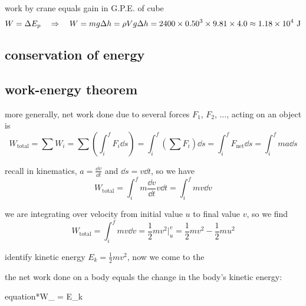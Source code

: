 \begin{soln}
    
work by crane equals gain in G.P.E. of cube
\begin{equation*}
W = \Delta E_p \quad \Rightarrow \quad W = mg\Delta h = \rho V g \Delta h = 2400 \times 0.50^3 \times 9.81 \times 4.0 \approx 1.18\times10^4 \text{ J} 
\end{equation*}
\end{soln}

\subsection{conservation of energy}\label{ch:conservation-of-energy}

\subsection{work-energy theorem \piste}

more generally, net work done due to several forces $F_1$, $F_2$, $\dots$, acting on an object is
\begin{equation*}
W_\text{total} = \sum W_i = \sum \left(\int_i^f F_i \dd s\right) = \int_i^f \left(\sum F_i \right)\dd s = \int_i^f F_\text{net} \dd s = \int_i^f ma \dd s
\end{equation*}

recall in kinematics, $a=\frac{\dd v}{\dd t}$ and $\dd s = v \dd t$, so we have
\begin{equation*}
W_\text{total} = \int_i^f m \frac{\dd v}{\dd t} v \dd t = \int_i^f m v \dd v
\end{equation*}

we are integrating over velocity from initial value $u$ to final value $v$, so we find
\begin{equation*}
W_\text{total} = \int_i^f m v \dd v = \frac{1}{2}mv^2 \Big|_u^v = \frac{1}{2}mv^2 - \frac{1}{2}mu^2
\end{equation*}

identify kinetic energy $E_k = \frac{1}{2}mv^2$, now we come to the   

\vspace*{-7pt}
\begin{ilight}
	the net work done on a body equals the change in the body's kinetic energy: \begin{empheq}[box=\tcbhighmath]{equation*}{W_ = \Delta E_k}\end{empheq}
\end{ilight}




